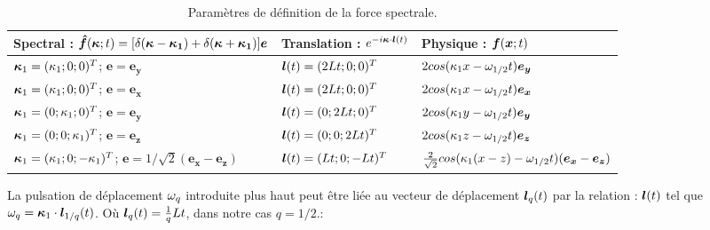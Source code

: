 \begin{table}
\begin{tabular}{lll}
Spectral : $\ghf(\bk;t) = [\d(\bm{\k}-\bm{\k_1}) + \d(\bm{\k}+\bm{\k_1})] \bm{e}$ & Translation : $e^{-i \bk \cdot \bl(t)}$ & Physique : $\gf(\bx;t)$  \\ \hline
$\bk_1 = (\k_1; 0; 0)^T$; $\bm{e} = \bm{e_y}$  &  $\bl(t) = (2Lt; 0; 0)^T$      & $ 2 cos(\k_1 x - \o_{1/2} t) \bm{e_y}$       \\
$\bk_1 = (\k_1; 0; 0)^T$; $\bm{e} = \bm{e_x}$  &  $\bl(t) = (2Lt; 0; 0)^T$      & $ 2 cos(\k_1 x - \o_{1/2} t) \bm{e_x}$       \\
$\bk_1 = (0; \k_1; 0)^T$; $\bm{e} = \bm{e_y}$  &  $\bl(t) = (0; 2Lt; 0)^T$      & $ 2 cos(\k_1 y - \o_{1/2} t) \bm{e_y}$       \\
$\bk_1 = (0; 0; \k_1)^T$; $\bm{e} = \bm{e_z}$  &  $\bl(t) = (0; 0; 2Lt)^T$      & $ 2 cos(\k_1 z - \o_{1/2} t) \bm{e_z}$       \\
$\bk_1 = (\k_1; 0; -\k_1)^T$; $\bm{e} = 1/\sqrt{2}(\bm{e_x}-\bm{e_z}) $ & $\bl(t) = (Lt; 0; -Lt)^T$ & $ \frac{2}{\sqrt{2}} cos(\k_1 (x-z) - \o_{1/2} t) (\bm{e_x}-\bm{e_z})$     \\ \hline
\end{tabular}
\caption{Paramètres de  définition de la force spectrale.}
\label{tab : spec_phys}

La pulsation de déplacement $\o_q$ introduite plus haut peut être liée au vecteur de déplacement $\bl_q(t)$ par la relation : $\bl(t)$ tel que $\o_q = \bk_1 \cdot \bl_{1/q}(t)$. Où $\bl_q(t) = \frac{1}{q} L t$, dans notre cas $q=1/2$.:
\end{table}


